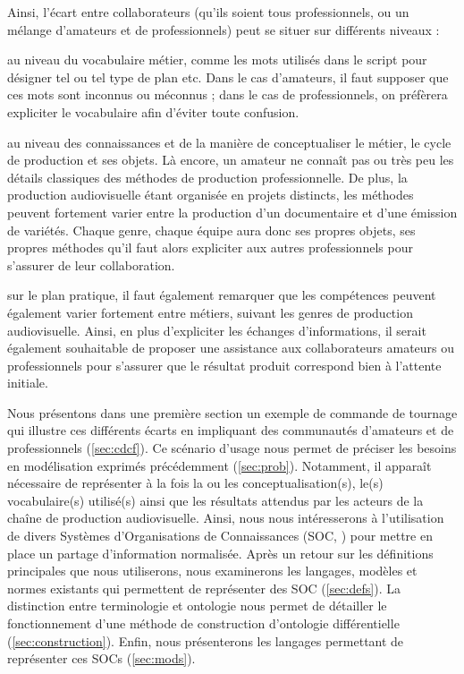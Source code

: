 Ainsi, l'écart entre collaborateurs (qu'ils soient tous professionnels, ou un mélange d'amateurs et de professionnels) peut se situer sur différents niveaux : 
\begin{liste} 
	\item au niveau du vocabulaire métier, comme les mots utilisés dans le script pour désigner tel ou tel type de plan etc. 
	Dans le cas d'amateurs, il faut supposer que ces mots sont inconnus ou méconnus ; dans le cas de professionnels, on préfèrera expliciter le vocabulaire afin d'éviter toute confusion. 
	
	\item au niveau des connaissances et de la manière de conceptualiser le métier, le cycle de production et ses objets. 
	Là encore, un amateur ne connaît pas ou très peu les détails classiques des méthodes de production professionnelle. 
	De plus, la production audiovisuelle étant organisée en projets distincts, les méthodes peuvent fortement varier entre la production d'un documentaire et d'une émission de variétés. 
	Chaque genre, chaque équipe aura donc ses propres objets, ses propres méthodes qu'il faut alors expliciter aux autres professionnels pour s'assurer de leur collaboration. 

	\item sur le plan pratique, il faut également remarquer que les compétences peuvent également varier fortement entre métiers, suivant les genres de production audiovisuelle. 
	Ainsi, en plus d'expliciter les échanges d'informations, il serait également souhaitable de proposer une assistance aux collaborateurs amateurs ou professionnels pour s'assurer que le résultat produit correspond bien à l'attente initiale. 	
\end{liste}


Nous présentons dans une première section un exemple de commande de tournage qui illustre ces différents écarts en impliquant des communautés d'amateurs et de professionnels (\ref{sec:cdcf}). 
Ce scénario d'usage nous permet de préciser les besoins en modélisation exprimés précédemment (\ref{sec:prob}).
Notamment, il apparaît nécessaire de représenter à la fois la ou les conceptualisation(s), le(s) vocabulaire(s) utilisé(s) ainsi que les résultats attendus par les acteurs de la chaîne de production audiovisuelle. 
Ainsi, nous nous intéresserons à l'utilisation de divers Systèmes d'Organisations de Connaissances (SOC, \cite{Zacklad2010}) pour mettre en place un partage d'information normalisée. 
Après un retour sur les définitions principales que nous utiliserons, nous examinerons les langages, modèles et normes existants qui permettent de représenter des SOC (\ref{sec:defs}).
La distinction entre terminologie et ontologie nous permet de détailler le fonctionnement d'une méthode de construction d'ontologie différentielle (\ref{sec:construction}).
Enfin, nous présenterons les langages permettant de représenter ces SOCs (\ref{sec:mods}). 

